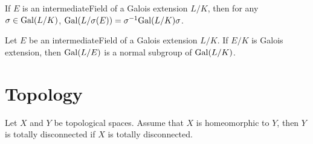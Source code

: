 \begin{theorem}
	\leanok
	If $E$ is an intermediateField of a Galois extension $L / K$, then for any $ \sigma \in \mathrm{Gal}(L / K) $, $ \mathrm{Gal}(L / \sigma(E)) = \sigma^{-1}\mathrm{Gal}(L / K)\sigma $.
\end{theorem}

\begin{theorem}
	\leanok
	Let $E$ be an intermediateField of a Galois extension $L / K$. If $ E / K $ is  
	Galois extension, then $ \mathrm{Gal}(L / E) $ is a normal subgroup of $ \mathrm{Gal}(L / K) $.
\end{theorem}

\section{Topology}

\begin{lemma}
	Let $ X $ and $ Y $ be topological spaces. Assume that $ X $ is homeomorphic to $ Y $, then $ Y $ is totally disconnected if $ X $ is totally disconnected.
\end{lemma}














